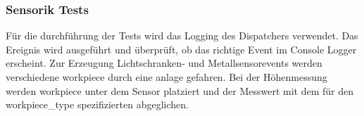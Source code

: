 \subsubsection{Sensorik Tests}\label{subsubsec:sensorik-tests}
Für die durchführung der Tests wird das Logging des Dispatchers verwendet.
Das Ereignis wird ausgeführt und überprüft, ob das richtige Event im Console Logger erscheint.
Zur Erzeugung Lichtschranken- und Metallsensorevents werden verschiedene \gls{workpiece} durch eine \gls{anlage} gefahren.
Bei der Höhenmessung werden \gls{workpiece} unter dem Sensor platziert und der Messwert mit dem für den \gls{workpiece_type}
spezifizierten abgeglichen.

\begin{table}[H]
\end{table}
